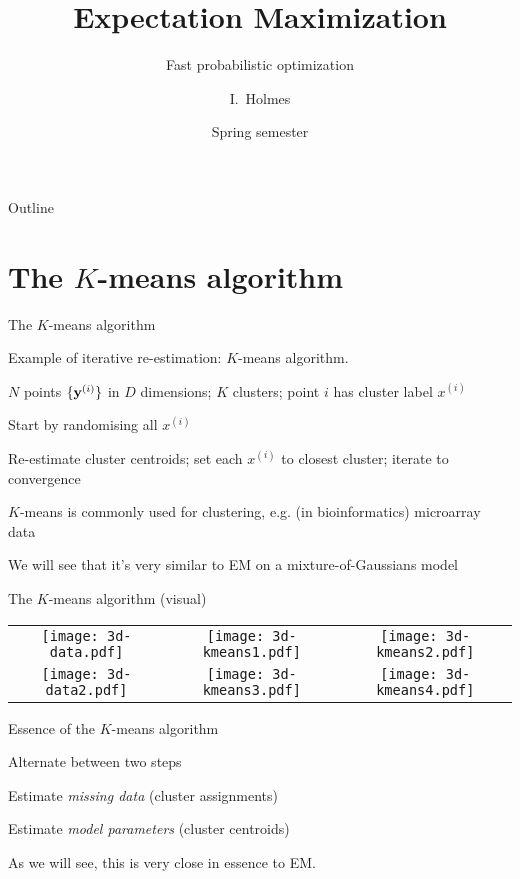 \documentclass{beamer}
\title[EM] %
{Expectation Maximization}
\subtitle
{Fast probabilistic optimization} %
\author%
{I.~Holmes} %
\institute[University of California, Berkeley] %
{
  Department of Bioengineering\\
  University of California, Berkeley}
\date%
{Spring semester}
\begin{document}
\begin{frame}
  \titlepage
\end{frame}

\begin{frame}{Outline}
  \tableofcontents
\end{frame}

\section{The $K$-means algorithm}

\begin{frame}{The $K$-means algorithm}


 Example of iterative re-estimation: $K$-means algorithm.
 \itemb
 \item $N$ points $\{{\bf y}^{(i)}\}$ in $D$ dimensions; $K$ clusters; point $i$ has cluster label $x^{(i)}$
 \item Start by randomising all $x^{(i)}$
 \item Re-estimate cluster centroids; set each $x^{(i)}$ to closest cluster; iterate to convergence
 \item $K$-means is commonly used for clustering, e.g. (in bioinformatics) microarray data
 \item We will see that it's very similar to EM on a mixture-of-Gaussians model
 \iteme

\end{frame}



\begin{frame}{The $K$-means algorithm (visual)}
\begin{tabular}{ccc}
\texttt{[image: 3d-data.pdf]}
&
\texttt{[image: 3d-kmeans1.pdf]}
&
\texttt{[image: 3d-kmeans2.pdf]}
\\
\texttt{[image: 3d-data2.pdf]}
&
\texttt{[image: 3d-kmeans3.pdf]}
&
\texttt{[image: 3d-kmeans4.pdf]}
\end{tabular}

\end{frame}


\begin{frame}{Essence of the $K$-means algorithm}


Alternate between two steps
 \itemb
 \item Estimate {\em missing data} (cluster assignments)
 \item Estimate {\em model parameters} (cluster centroids)
 \iteme

\vspace{\baselineskip}

As we will see, this is very close in essence to EM.

\end{frame}
\end{document}
